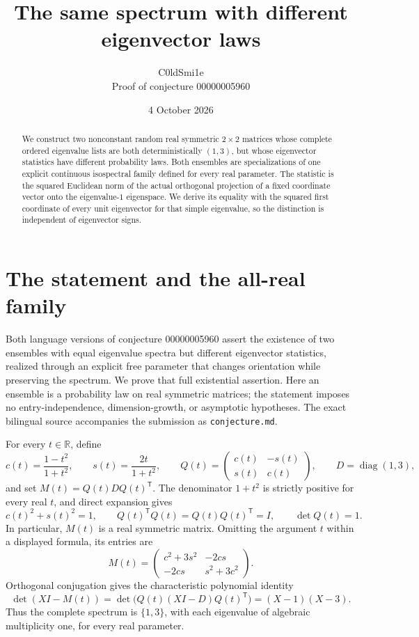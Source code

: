 \documentclass[10pt]{article}
\title{The same spectrum with different eigenvector laws}
\author{C0ldSmi1e\\\small Proof of conjecture 00000005960}
\date{4 October 2026}
\newcommand{\R}{\mathbb R}
\newcommand{\diag}{\operatorname{diag}}
\begin{document}
\maketitle
\begin{abstract}
We construct two nonconstant random real symmetric $2\times2$ matrices whose complete ordered eigenvalue lists are both deterministically $(1,3)$, but whose eigenvector statistics have different probability laws. Both ensembles are specializations of one explicit continuous isospectral family defined for every real parameter. The statistic is the squared Euclidean norm of the actual orthogonal projection of a fixed coordinate vector onto the eigenvalue-$1$ eigenspace. We derive its equality with the squared first coordinate of every unit eigenvector for that simple eigenvalue, so the distinction is independent of eigenvector signs.
\end{abstract}

\section{The statement and the all-real family}
Both language versions of conjecture 00000005960 assert the existence of two ensembles with equal eigenvalue spectra but different eigenvector statistics, realized through an explicit free parameter that changes orientation while preserving the spectrum. We prove that full existential assertion. Here an ensemble is a probability law on real symmetric matrices; the statement imposes no entry-independence, dimension-growth, or asymptotic hypotheses. The exact bilingual source accompanies the submission as \texttt{conjecture.md}.

For every $t\in\R$, define
\[
 c(t)=\frac{1-t^2}{1+t^2},\qquad
 s(t)=\frac{2t}{1+t^2},\qquad
 Q(t)=\begin{pmatrix}c(t)&-s(t)\\s(t)&c(t)\end{pmatrix},
 \qquad D=\diag(1,3),
\]
and set $M(t)=Q(t)DQ(t)^{\mathsf T}$. The denominator $1+t^2$ is strictly positive for every real $t$, and direct expansion gives
\[
 c(t)^2+s(t)^2=1,\qquad
 Q(t)^{\mathsf T}Q(t)=Q(t)Q(t)^{\mathsf T}=I,\qquad \det Q(t)=1.
\]
In particular, $M(t)$ is a real symmetric matrix. Omitting the argument $t$ within a displayed formula, its entries are
\begin{equation}\label{eq:entries}
 M(t)=\begin{pmatrix}c^2+3s^2&-2cs\\-2cs&s^2+3c^2\end{pmatrix}.
\end{equation}
Orthogonal conjugation gives the characteristic polynomial identity
\begin{equation}\label{eq:charpoly}
 \det(XI-M(t))=\det\bigl(Q(t)(XI-D)Q(t)^{\mathsf T}\bigr)
 =(X-1)(X-3).
\end{equation}
Thus the complete spectrum is $\{1,3\}$, with each eigenvalue of algebraic multiplicity one, for every real parameter.
\end{document}
